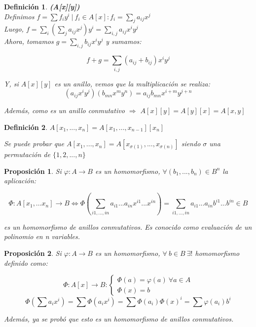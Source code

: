 \documentclass[11pt, a4paper, titlepage]{article}
\theoremstyle{theorem-style}
\newtheorem*{nprop}{Proposición}
\theoremstyle{definition-style}
\newtheorem*{ndef}{Definición}
\theoremstyle{remark-style}
\theoremstyle{example-style}
\begin{document}
\begin{ndef} \textbf{(A[x][y])}
\hfill \\
Definimos $f=\sum f_i y^i\ |\ f_i \in A[x] : f_i = \sum_j a_{ij}x^j$\\
Luego, $f = \sum_i (\sum_j a_{ij}x^j)y^i = \sum_{i,j} a_{ij}x^iy^j$\\

Ahora, tomamos $g =\sum_{i,j} b_{ij}x^iy^j$ y sumamos:

\[
f+g = \sum_{i,j}(a_{ij}+b_{ij})x^iy^j
\]

Y, si $A[x][y]$ es un anillo, vemos que la multiplicación se realiza:
\[
(a_{ij}x^iy^j)(b_{mn}x^my^n) = a_{ij}b_{mn} x^{i+m}y^{j+n}
\]


Además, como es un anillo conmutativo $\Rightarrow$ $A[x][y] = A[y][x] = A[x,y]$

	
\end{ndef}


\begin{ndef}
	$A[x_1,...,x_n] = A[x_1,...,x_{n-1}][x_n]$

Se puede probar que $A[x_1,...,x_n] = A[x_{\sigma(1)},...,x_{\sigma(n)}]$ siendo $\sigma$ una permutación de $\{1,2,...,n \}$
\end{ndef}

\begin{nprop}
	
Si $\varphi :A \to B$ es un homomorfismo, $\forall(b_1,...,b_n) \in B^n$ la aplicación:

\[
\Phi:A[x_1,...x_n] \to B \iff \Phi(\sum_{i1,...,in}a_{i1}...a_{in}x^{i1}... x^{in}) = \sum_{i1,...,in}a_{i1}...a_{in}b^{i1}... b^{in} \in B
\]

es un homomorfismo de anillos conmutativos. Es conocido como evaluación de un polinomio en n variables.

\end{nprop}



\begin{nprop}
	Si $\varphi:A \to B$ es un homomorfismo, $\forall\  b \in B\  \exists ! $ homomorfismo definido como:
	
\[
\Phi:A[x] \to B : \begin{cases}
	\Phi(a) = \varphi(a)\ \forall a \in A \\
	\Phi(x) = b 
\end{cases}
\]
\[
\Phi(\sum a_i x^i) = \sum \Phi(a_i x^i) =  \sum \Phi(a_i) \Phi(x)^i = \sum \varphi(a_i) b^i
\]

Además, ya se probó que esto es un homomorfismo de anillos conmutativos.

\end{nprop}
\end{document}
